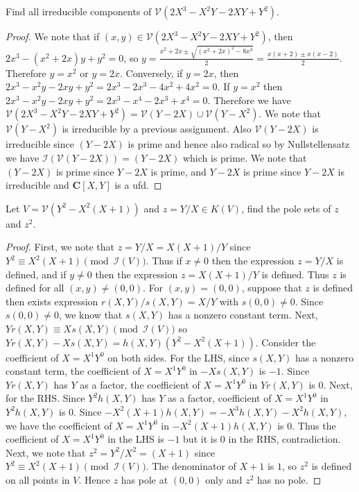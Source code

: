\documentclass[11pt]{book}
\begin{document}
\begin{problem}
Find all irreducible components of $\mathcal{V}(2X^3-X^2Y-2XY+Y^2)$.
\begin{proof}
We note that if $(x,y)\in\mathcal{V}(2X^3-X^2Y-2XY+Y^2)$, then $2x^3-(x^2+2x)y+y^2=0$, so $y=\frac{x^2+2x\pm\sqrt{(x^2+2x)^2-8x^3}}{2}=\frac{x(x+2)\pm x(x-2)}{2}$. Therefore $y=x^2$ or $y=2x$. Conversely, if $y=2x$, then $2x^3-x^2y-2xy+y^2=2x^3-2x^3-4x^2+4x^2=0$. If $y=x^2$ then $2x^3-x^2y-2xy+y^2=2x^3-x^4-2x^3+x^4=0$. Therefore we have $\mathcal{V}(2X^3-X^2Y-2XY+Y^2)=\mathcal{V}(Y-2X)\cup\mathcal{V}(Y-X^2)$. We note that $\mathcal{V}(Y-X^2)$ is irreducible by a previous assignment. Also $\mathcal{V}(Y-2X)$ is irreducible since $(Y-2X)$ is prime and hence also radical so by Nullstellensatz we have $\mathcal{I}(\mathcal{V}(Y-2X))=(Y-2X)$ which is prime. %
We note that $(Y-2X)$ is prime since $Y-2X$ is prime, and $Y-2X$ is prime since $Y-2X$ is irreducible and $\mathbf C[X,Y]$ is a ufd.
\end{proof}
\end{problem}
\begin{problem}
Let $V=\mathcal{V}(Y^2-X^2(X+1))$ and $z=Y/X\in K (V)$, find the pole sets of $z$ and $z^2$.
\begin{proof}
First, we note that $z=Y/X=X(X+1)/Y$ since $Y^2\equiv X^2(X+1)\pmod{\mathcal{I}(V)}$. Thus if $x\ne 0$ then the expression $z=Y/X$ is defined, and if $y\ne 0$ then the expression $z=X(X+1)/Y$ is defined. Thus $z$ is defined for all $(x,y)\ne (0,0)$. For $(x,y)=(0,0)$, suppose that $z$ is defined then exists expression $r(X,Y)/s(X,Y)=X/Y$ with $s(0,0)\ne 0$. Since $s(0,0)\ne 0$, we know that $s(X,Y)$ has a nonzero constant term. Next, $Yr(X,Y)\equiv Xs(X,Y)\pmod{\mathcal I(V)}$ so $Yr(X,Y)- Xs(X,Y)=h(X,Y)(Y^2-X^2(X+1))$. Consider the coefficient of $X=X^1Y^0$ on both sides. For the LHS, since $s(X,Y)$ has a nonzero constant term, the coefficient of $X=X^1Y^0$ in $-Xs(X,Y)$ is $-1$. Since $Yr(X,Y)$ has $Y$ as a factor, the coefficient of $X=X^1Y^0$ in $Yr(X,Y)$ is $0$. Next, for the RHS. Since $Y^2h(X,Y)$ has $Y$ as a factor, coefficient of $X=X^1Y^0$ in $Y^2h(X,Y)$ is $0$. Since $-X^2(X+1)h(X,Y)=-X^3h(X,Y)-X^2h(X,Y)$, we have the coefficient of $X=X^1Y^0$ in $-X^2(X+1)h(X,Y)$ is $0$. Thus the coefficient of $X=X^1Y^0$ in the LHS is $-1$ but it is $0$ in the RHS, contradiction. Next, we note that $z^2=Y^2/X^2=(X+1)$ since $Y^2\equiv X^2(X+1)\pmod{\mathcal{I}(V)}$. The denominator of $X+1$ is $1$, so $z^2$ is defined on all points in $V$. Hence $z$ has pole at $(0,0)$ only and $z^2$ has no pole.
\end{proof}
\end{problem}
\end{document}
